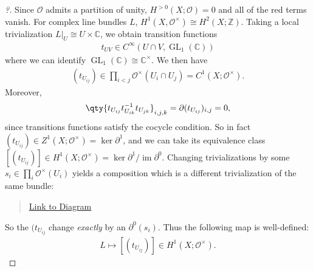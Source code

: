\begin{proof}[?]
Since \({\mathcal{O}}\) admits a partition of unity,
\(H^{>0}(X; {\mathcal{O}}) = 0\) and all of the red terms vanish. For
complex line bundles \(L\),
\(H^1(X, {\mathcal{O}}^{\times}) \cong H^2(X; {\mathbb{Z}})\). Taking a
local trivialization
\({ \left.{{L}} \right|_{{U}} } \cong U \times{\mathbb{C}}\), we obtain
transition functions
\begin{align*}
t_{UV} \in C^{\infty }(U \cap V, \operatorname{GL}_1({\mathbb{C}}) )
\end{align*}
where we can identify
\(\operatorname{GL}_1({\mathbb{C}}) \cong {\mathbb{C}}^{\times}\). We
then have
\begin{align*}
(t_{U_{ij}}) \in \prod_{i < j} {\mathcal{O}}^{\times}(U_i \cap U_j) = C^1(X; {\mathcal{O}}^{\times})
.\end{align*}
Moreover,
\begin{align*}
\qty{ 
t_{U_{ij}}
t_{U_{ik}} ^{-1}
t_{U_{jk}}
}_{i,j,k} 
= {{\partial}}( t_{U_{ij} } ) _{i, j} = 0
,\end{align*}
since transitions functions satisfy the cocycle condition. So in fact
\((t_{U_{ij}}) \in Z^1(X; {\mathcal{O}}^{\times}) = \ker {{\partial}}^1\),
and we can take its equivalence class
\([ ( t_{U_{ij} } ) ] \in H^1(X; {\mathcal{O}}^{\times}) = \ker {{\partial}}^1 / \operatorname{im}{{\partial}}^0\).
Changing trivializations by some
\(s_i \in \prod_i {\mathcal{O}}^{\times}(U_i)\) yields a composition
which is a different trivialization of the same bundle:

\begin{center}
\end{center}

\begin{quote}
\href{https://q.uiver.app/?q=WzAsMyxbMCwwLCJcXHJve0x9e1VfaX0iXSxbMiwwLCJVX2kgXFxjcm9zcyBcXENDIl0sWzUsMCwiVV9pIFxcY3Jvc3MgXFxDQyJdLFswLDEsImhfaSJdLFsxLDIsIlxcY2RvdCBzX2kiXSxbMCwyLCIiLDIseyJjdXJ2ZSI6NX1dXQ==}{Link
to Diagram}
\end{quote}

So the \((t_{ U_{ij}}\) change \emph{exactly} by an
\({{\partial}}^0( s_i)\). Thus the following map is well-defined:
\begin{align*}
L \mapsto [ (t_{U_{ij}} ) ] \in H^1(X; {\mathcal{O}}^{\times})
.\end{align*}


\end{proof}
